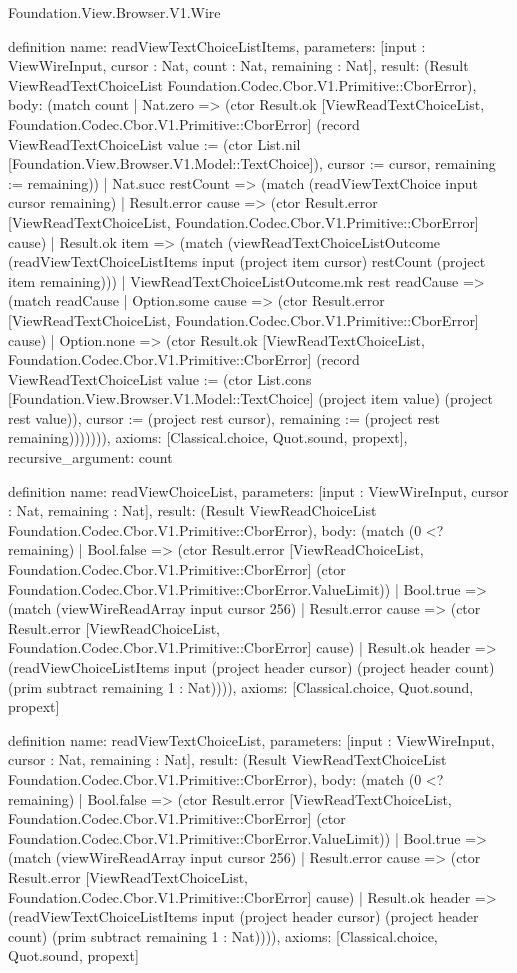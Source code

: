 \begin{lexlean}{Foundation.View.Browser.V1.Wire}
\begin{semanticmodule}
definition{
  name: readViewTextChoiceListItems,
  parameters: [input : ViewWireInput, cursor : Nat, count : Nat, remaining : Nat],
  result: (Result ViewReadTextChoiceList Foundation.Codec.Cbor.V1.Primitive::CborError),
  body: (match count
    | Nat.zero => (ctor Result.ok [ViewReadTextChoiceList, Foundation.Codec.Cbor.V1.Primitive::CborError] (record ViewReadTextChoiceList {value := (ctor List.nil [Foundation.View.Browser.V1.Model::TextChoice]), cursor := cursor, remaining := remaining}))
    | Nat.succ restCount => (match (readViewTextChoice input cursor remaining)
      | Result.error cause => (ctor Result.error [ViewReadTextChoiceList, Foundation.Codec.Cbor.V1.Primitive::CborError] cause)
      | Result.ok item => (match (viewReadTextChoiceListOutcome (readViewTextChoiceListItems input (project item cursor) restCount (project item remaining)))
        | ViewReadTextChoiceListOutcome.mk rest readCause => (match readCause
          | Option.some cause => (ctor Result.error [ViewReadTextChoiceList, Foundation.Codec.Cbor.V1.Primitive::CborError] cause)
          | Option.none => (ctor Result.ok [ViewReadTextChoiceList, Foundation.Codec.Cbor.V1.Primitive::CborError] (record ViewReadTextChoiceList {value := (ctor List.cons [Foundation.View.Browser.V1.Model::TextChoice] (project item value) (project rest value)), cursor := (project rest cursor), remaining := (project rest remaining)})))))),
  axioms: [Classical.choice, Quot.sound, propext],
  recursive_argument: count
}

definition{
  name: readViewChoiceList,
  parameters: [input : ViewWireInput, cursor : Nat, remaining : Nat],
  result: (Result ViewReadChoiceList Foundation.Codec.Cbor.V1.Primitive::CborError),
  body: (match (0 <? remaining)
    | Bool.false => (ctor Result.error [ViewReadChoiceList, Foundation.Codec.Cbor.V1.Primitive::CborError] (ctor Foundation.Codec.Cbor.V1.Primitive::CborError.ValueLimit))
    | Bool.true => (match (viewWireReadArray input cursor 256)
      | Result.error cause => (ctor Result.error [ViewReadChoiceList, Foundation.Codec.Cbor.V1.Primitive::CborError] cause)
      | Result.ok header => (readViewChoiceListItems input (project header cursor) (project header count) (prim subtract remaining 1 : Nat)))),
  axioms: [Classical.choice, Quot.sound, propext]
}

definition{
  name: readViewTextChoiceList,
  parameters: [input : ViewWireInput, cursor : Nat, remaining : Nat],
  result: (Result ViewReadTextChoiceList Foundation.Codec.Cbor.V1.Primitive::CborError),
  body: (match (0 <? remaining)
    | Bool.false => (ctor Result.error [ViewReadTextChoiceList, Foundation.Codec.Cbor.V1.Primitive::CborError] (ctor Foundation.Codec.Cbor.V1.Primitive::CborError.ValueLimit))
    | Bool.true => (match (viewWireReadArray input cursor 256)
      | Result.error cause => (ctor Result.error [ViewReadTextChoiceList, Foundation.Codec.Cbor.V1.Primitive::CborError] cause)
      | Result.ok header => (readViewTextChoiceListItems input (project header cursor) (project header count) (prim subtract remaining 1 : Nat)))),
  axioms: [Classical.choice, Quot.sound, propext]
}


\end{semanticmodule}
\end{lexlean}
